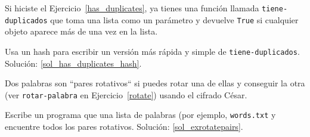 \begin{exercise}
\label{has_duplicates_hash}

Si hiciste el Ejercicio~\ref{has_duplicates}, ya tienes una función
llamada \verb|tiene-duplicados| que toma una lista como un 
parámetro y devuelve {\tt True} si cualquier objeto aparece más
de una vez en la lista.

Usa un hash para escribir un versión más rápida y simple
de \verb|tiene-duplicados|.
Solución: \ref{sol_has_duplicates_hash}.

\end{exercise}


\begin{exercise}
\label{exrotatepairs}

Dos palabras son ``pares rotativos`` si puedes rotar una de ellas
y conseguir la otra (ver \verb"rotar-palabra" en 
Ejercicio~\ref{rotate}) usando el cifrado César.

Escribe un programa que una lista de palabras (por ejemplo, {\tt words.txt}
y encuentre todos los pares rotativos.
Solución: \ref{sol_exrotatepairs}.

\end{exercise}


